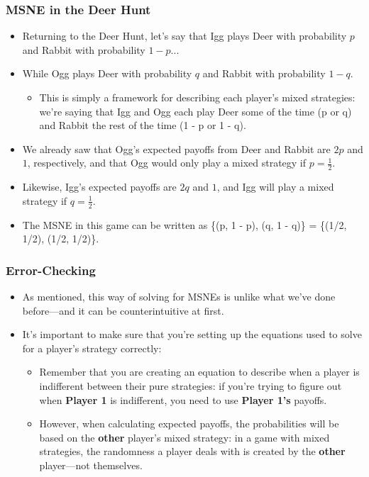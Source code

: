 \begin{frame}
\frametitle{MSNE in the Deer Hunt}
\begin{itemize}
	\item Returning to the Deer Hunt, let's say that Igg plays Deer with probability $p$ and Rabbit with probability $1 - p$...
	\item While Ogg plays Deer with probability $q$ and Rabbit with probability $1 - q$.
	\begin{itemize}
		\item This is simply a framework for describing each player's mixed strategies: we're saying that Igg and Ogg each play Deer some of the time (p or q) and Rabbit the rest of the time (1 - p or 1 - q).
	\end{itemize}
	\item We already saw that Ogg's expected payoffs from Deer and Rabbit are $2p$ and $1$, respectively, and that Ogg would only play a mixed strategy if $p = \frac{1}{2}$.
	\item Likewise, Igg's expected payoffs are $2q$ and $1$, and Igg will play a mixed strategy if $q = \frac{1}{2}$.
	\item The MSNE in this game can be written as \{(p, 1 - p), (q, 1 - q)\} = \{(1/2, 1/2), (1/2, 1/2)\}.
\end{itemize}
\end{frame}

\begin{frame}
\frametitle{Error-Checking}
\begin{itemize}
	\item As mentioned, this way of solving for MSNEs is unlike what we've done before---and it can be counterintuitive at first.
	\item It's important to make sure that you're setting up the equations used to solve for a player's strategy correctly:
	\begin{itemize}
		\item Remember that you are creating an equation to describe when a player is indifferent between their pure strategies: if you're trying to figure out when \textbf{Player 1} is indifferent, you need to use \textbf{Player 1's} payoffs.
		\item However, when calculating expected payoffs, the probabilities will be based on the \textbf{other} player's mixed strategy: in a game with mixed strategies, the randomness a player deals with is created by the \textbf{other} player---not themselves.
	\end{itemize}
\end{itemize}
\end{frame}

